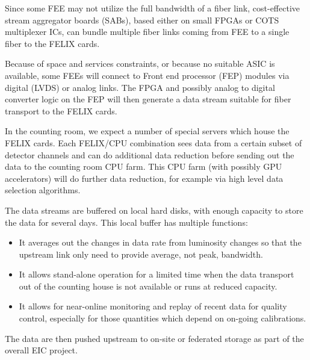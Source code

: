 Since some FEE may not utilize the full bandwidth of a fiber link, cost-effective stream aggregator boards (SABs), based either on small FPGAs or COTS multiplexer ICs, can bundle multiple fiber links coming from FEE to a single fiber to the FELIX cards. 

Because of space and services constraints, or because no suitable ASIC is available, some FEEs will connect to Front end processor (FEP) modules via digital (LVDS) or analog links. The FPGA and possibly analog to digital converter logic on the FEP will then generate a data stream suitable for fiber transport to the FELIX cards.

In the counting room, we expect a number of special servers which house the FELIX cards. Each FELIX/CPU combination sees data from a certain subset of detector channels and can do additional data reduction before sending out the data to the counting room CPU farm. This CPU farm (with possibly GPU accelerators) will do further data reduction, for example via high level data selection algorithms.

The data streams are buffered on local hard disks, with enough capacity to store the data for several days. This local buffer has multiple functions: 
\begin{itemize}
    \item It averages out the changes in data rate from luminosity changes so that the upstream link only need to provide average, not peak, bandwidth.
    \item It allows stand-alone operation for a limited time when the data transport out of the counting house is not available or runs at reduced capacity.
    \item It allows for near-online monitoring and replay of recent data for quality control, especially for those quantities which depend on on-going calibrations.        
\end{itemize}

The data are then pushed upstream to on-site or federated storage as part of the overall EIC project.


